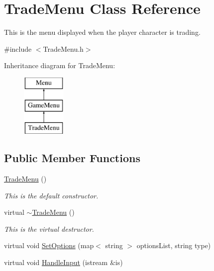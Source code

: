\hypertarget{classTradeMenu}{\section{Trade\-Menu Class Reference}
\label{classTradeMenu}
}


This is the menu displayed when the player character is trading.  




{\ttfamily \#include $<$Trade\-Menu.\-h$>$}

Inheritance diagram for Trade\-Menu\-:\begin{figure}[H]
\begin{center}
\leavevmode
\includegraphics[height=3.000000cm]{classTradeMenu}
\end{center}
\end{figure}
\subsection*{Public Member Functions}
\begin{DoxyCompactItemize}
\item 
\hypertarget{classTradeMenu_a3b09de2db8d3b7a1f88fe9b62fe7b4ec}{\hyperlink{classTradeMenu_a3b09de2db8d3b7a1f88fe9b62fe7b4ec}{Trade\-Menu} ()}\label{classTradeMenu_a3b09de2db8d3b7a1f88fe9b62fe7b4ec}

\begin{DoxyCompactList}\small\item\em This is the default constructor. \end{DoxyCompactList}\item 
\hypertarget{classTradeMenu_a4cac984a95c426346594646b2408f3b0}{virtual \hyperlink{classTradeMenu_a4cac984a95c426346594646b2408f3b0}{$\sim$\-Trade\-Menu} ()}\label{classTradeMenu_a4cac984a95c426346594646b2408f3b0}

\begin{DoxyCompactList}\small\item\em This is the virtual destructor. \end{DoxyCompactList}\item 
virtual void \hyperlink{classTradeMenu_a60cbb4e35a30cceab30448e19d13a882}{Set\-Options} (map$<$ string $>$ options\-List, string type)
\item 
virtual void \hyperlink{classTradeMenu_a743dd5b1984d2640865ecd71d6e73d5e}{Handle\-Input} (istream \&is)
\end{DoxyCompactItemize}
